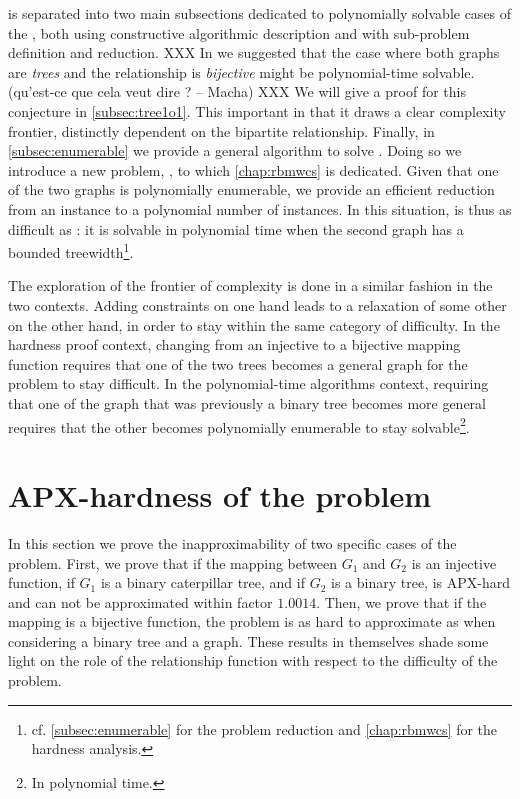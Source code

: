 	 is separated into two main subsections dedicated to polynomially solvable cases of the \mwccs{}, both using constructive algorithmic description and with sub-problem definition and reduction.
	XXX In \cite{hume2015approximation} we suggested that the case where both graphs are \emph{trees} and the relationship is \emph{bijective} might be polynomial-time solvable. (qu'est-ce que cela veut dire ? -- Macha) XXX
	We will give a proof for this conjecture in \cref{subsec:tree1o1}.
	This important in that it draws a clear complexity frontier, distinctly dependent on the bipartite relationship.
	Finally, in \cref{subsec:enumerable} we provide a general algorithm to solve \mwccs{}.
	Doing so we introduce a new problem, \rbmwcs{}, to which \cref{chap:rbmwcs} is dedicated.
	Given that one of the two graphs is polynomially enumerable, we provide an efficient reduction from an \mwccs{} instance to a polynomial number of \rbmwcs{} instances.
	In this situation, \mwccs{} is thus as difficult as \rbmwcs{}: it is solvable in polynomial time when the second graph has a bounded treewidth\footnote{cf. \cref{subsec:enumerable} for the problem reduction and \cref{chap:rbmwcs} for the \rbmwcs{} hardness analysis.}.

	The exploration of the frontier of complexity is done in a similar fashion in the two contexts.
	Adding constraints on one hand leads to a relaxation of some other on the other hand, in order to stay within the same category of difficulty.
	In the hardness proof context, changing from an injective to a bijective mapping function requires that one of the two trees becomes a general graph for the problem to stay difficult.
	In the polynomial-time algorithms context, requiring that one of the graph that was previously a binary tree becomes more general%
	requires that the other becomes polynomially enumerable to stay solvable\footnote{In polynomial time.}.
	
	\section{APX-hardness of the \mwccs{} problem}
	\label{sec:apx}

		In this section we prove the inapproximability of two specific cases of the \mwccs{} problem.
		First, we prove that if the mapping between $G_1$ and $G_2$ is an injective function, if $G_1$ is a binary caterpillar tree, and if $G_2$ is a binary tree, \mwccs{} is APX-hard and can not be approximated within factor $1.0014$.
		Then, we prove that if the mapping is a bijective function, the problem is as hard to approximate as when considering a binary tree and a graph.
		These results in themselves shade some light on the role of the relationship function with respect to the difficulty of the problem.

